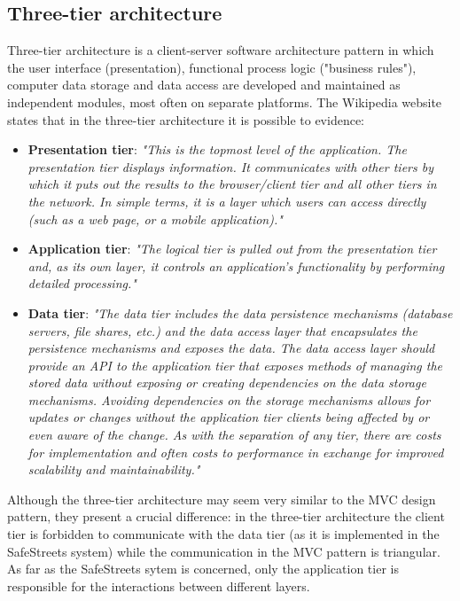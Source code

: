 \subsection{Three-tier architecture}
Three-tier architecture is a client-server software architecture pattern in which the user interface (presentation), functional process logic ("business rules"), computer data storage and data access are developed and maintained as independent modules, most often on separate platforms. The Wikipedia website states that in the three-tier architecture it is possible to evidence:
\begin{itemize}
    \item \textbf{Presentation tier}: 
    \textit{"This is the topmost level of the application. The presentation tier displays information. It communicates with other tiers by which it puts out the results to the browser/client tier and all other tiers in the network. In simple terms, it is a layer which users can access directly (such as a web page, or a mobile application)."}
    \item \textbf{Application tier}: \textit{
    "The logical tier is pulled out from the presentation tier and, as its own layer, it controls an application’s functionality by performing detailed processing."}
    \item \textbf{Data tier}: \textit{
        "The data tier includes the data persistence mechanisms (database servers, file shares, etc.) and the data access layer that encapsulates the persistence mechanisms and exposes the data. The data access layer should provide an API to the application tier that exposes methods of managing the stored data without exposing or creating dependencies on the data storage mechanisms. Avoiding dependencies on the storage mechanisms allows for updates or changes without the application tier clients being affected by or even aware of the change. As with the separation of any tier, there are costs for implementation and often costs to performance in exchange for improved scalability and maintainability."}
\end{itemize}
Although the three-tier architecture may seem very similar to the MVC design pattern, they present a crucial difference: in the three-tier architecture the client tier is forbidden to communicate with the data tier (as it is implemented in the SafeStreets system) while the communication in the MVC pattern is triangular. As far as the SafeStreets sytem is concerned, only the application tier is responsible for the interactions between different layers.